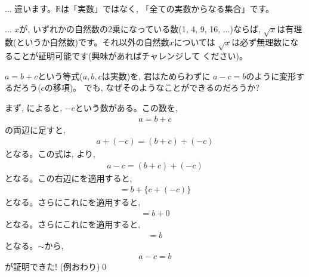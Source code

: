 \begin{freqmiss}{\small{} ... 
違います。$\mathbb{R}$は「実数」ではなく, 「全ての実数からなる集合」です。}\end{freqmiss}



\begin{faq}{\small{}
... $x$が, いずれかの自然数の2乗になっている数(1, 4, 9, 16, ...)ならば, 
$\sqrt{x}$は有理数(というか自然数)です。それ以外の自然数$x$については
$\sqrt{x}$は必ず無理数になることが証明可能です(興味があればチャレンジして
ください)。}\end{faq}


\begin{exmpl} $a=b+c$という等式($a, b, c$は実数)を, 君はためらわずに
$a-c=b$のように変形するだろう($c$の移項)。
でも, なぜそのようなことができるのだろうか?

まず, によると, 
$-c$という数がある。この数を, 
\begin{eqnarray}
a=b+c
\end{eqnarray}
の両辺に足すと, 
\begin{eqnarray}
a+(-c)=(b+c)+(-c)
\end{eqnarray}
となる。この式は, より, 
\begin{eqnarray}
a-c=(b+c)+(-c)\label{alg_ikou_proof1}
\end{eqnarray}
となる。この右辺にを適用すると, 
\begin{eqnarray}
=b+\{c+(-c)\}
\end{eqnarray}
となる。さらにこれにを適用すると, 
\begin{eqnarray}
=b+0
\end{eqnarray}
となる。さらにこれにを適用すると, 
\begin{eqnarray}
=b\label{alg_ikou_proof8}
\end{eqnarray}
となる。$\sim$から, 
\begin{eqnarray}
a-c=b
\end{eqnarray}
が証明できた! (例おわり)\qed
\end{exmpl}

